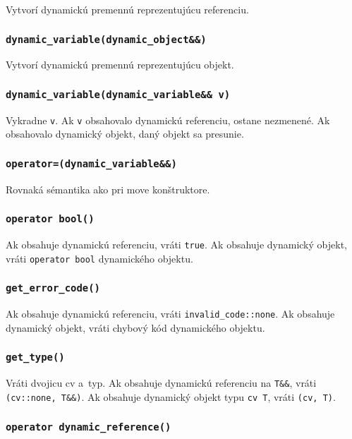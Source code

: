Vytvorí dynamickú premennú reprezentujúcu referenciu.

\subsubsection{\texttt{dynamic\_variable(dynamic\_object\&\&)}}

Vytvorí dynamickú premennú reprezentujúcu objekt.

\subsubsection{\texttt{dynamic\_variable(dynamic\_variable\&\& v)}}

Vykradne \texttt{v}. Ak \texttt{v} obsahovalo dynamickú referenciu, ostane nezmenené. Ak obsahovalo dynamický objekt, daný objekt sa presunie.

\subsubsection{\texttt{operator=(dynamic\_variable\&\&)}}

Rovnaká sémantika ako pri move konštruktore.

\subsubsection{\texttt{operator bool()}}

Ak obsahuje dynamickú referenciu, vráti \texttt{true}. Ak obsahuje dynamický objekt, vráti \texttt{operator bool} dynamického objektu.

\subsubsection{\texttt{get\_error\_code()}}

Ak obsahuje dynamickú referenciu, vráti \texttt{invalid\_code::none}. Ak obsahuje dynamický objekt, vráti chybový kód dynamického objektu.

\subsubsection{\texttt{get\_type()}}

Vráti dvojicu cv a~typ. Ak obsahuje dynamickú referenciu na \texttt{T\&\&}, vráti \texttt{(cv::none, T\&\&)}. Ak obsahuje dynamický objekt typu \texttt{cv T}, vráti \texttt{(cv, T)}.

\subsubsection{\texttt{operator dynamic\_reference()}}


